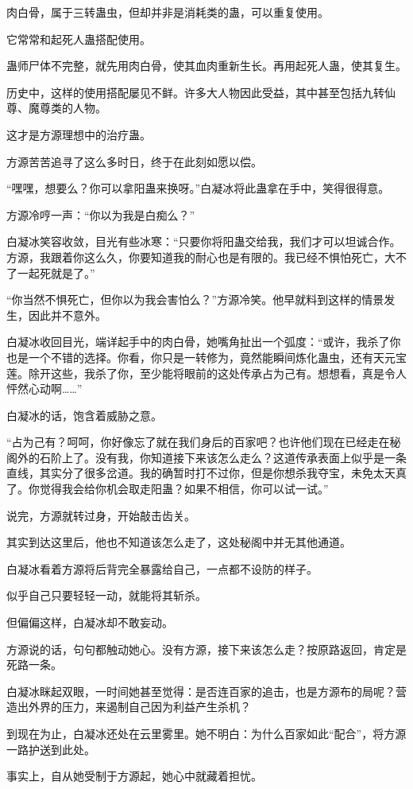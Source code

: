 \begin{this_body}
肉白骨，属于三转蛊虫，但却并非是消耗类的蛊，可以重复使用。

它常常和起死人蛊搭配使用。

蛊师尸体不完整，就先用肉白骨，使其血肉重新生长。再用起死人蛊，使其复生。

历史中，这样的使用搭配屡见不鲜。许多大人物因此受益，其中甚至包括九转仙尊、魔尊类的人物。

这才是方源理想中的治疗蛊。

方源苦苦追寻了这么多时日，终于在此刻如愿以偿。

“嘿嘿，想要么？你可以拿阳蛊来换呀。”白凝冰将此蛊拿在手中，笑得很得意。

方源冷哼一声：“你以为我是白痴么？”

白凝冰笑容收敛，目光有些冰寒：“只要你将阳蛊交给我，我们才可以坦诚合作。方源，我跟着你这么久，你要知道我的耐心也是有限的。我已经不惧怕死亡，大不了一起死就是了。”

“你当然不惧死亡，但你以为我会害怕么？”方源冷笑。他早就料到这样的情景发生，因此并不意外。

白凝冰收回目光，端详起手中的肉白骨，她嘴角扯出一个弧度：“或许，我杀了你也是一个不错的选择。你看，你只是一转修为，竟然能瞬间炼化蛊虫，还有天元宝莲。除开这些，我杀了你，至少能将眼前的这处传承占为己有。想想看，真是令人怦然心动啊……”

白凝冰的话，饱含着威胁之意。

“占为己有？呵呵，你好像忘了就在我们身后的百家吧？也许他们现在已经走在秘阁外的石阶上了。没有我，你知道接下来该怎么走么？这道传承表面上似乎是一条直线，其实分了很多岔道。我的确暂时打不过你，但是你想杀我夺宝，未免太天真了。你觉得我会给你机会取走阳蛊？如果不相信，你可以试一试。”

说完，方源就转过身，开始敲击齿关。

其实到达这里后，他也不知道该怎么走了，这处秘阁中并无其他通道。

白凝冰看着方源将后背完全暴露给自己，一点都不设防的样子。

似乎自己只要轻轻一动，就能将其斩杀。

但偏偏这样，白凝冰却不敢妄动。

方源说的话，句句都触动她心。没有方源，接下来该怎么走？按原路返回，肯定是死路一条。

白凝冰眯起双眼，一时间她甚至觉得：是否连百家的追击，也是方源布的局呢？营造出外界的压力，来遏制自己因为利益产生杀机？

到现在为止，白凝冰还处在云里雾里。她不明白：为什么百家如此“配合”，将方源一路护送到此处。

事实上，自从她受制于方源起，她心中就藏着担忧。


\end{this_body}
